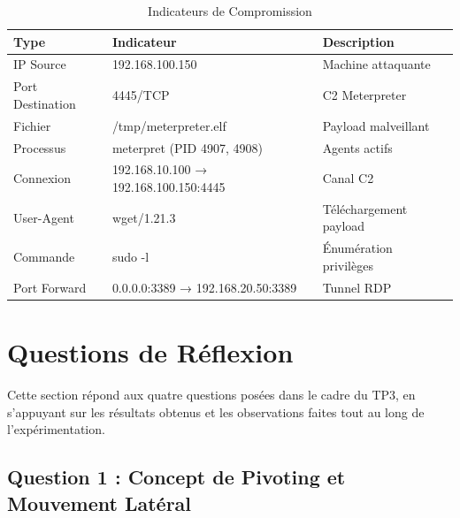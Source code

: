 \documentclass[12pt,a4paper,openany]{report}
\newcommand{\tableheadcolor}{\rowcolor{tableheadbg}}
\begin{document}
	\begin{table}[H]
		\centering
		\small
		\renewcommand{\arraystretch}{1.3}
		\setlength{\arrayrulewidth}{0.5pt}
		\begin{tabular}{p{3.5cm} p{4cm} p{5cm}}
			\arrayrulecolor{tableborder}
			\hline
			\tableheadcolor
			\textcolor{tableheadfg}{\textbf{Type}} &
			\textcolor{tableheadfg}{\textbf{Indicateur}} &
			\textcolor{tableheadfg}{\textbf{Description}} \\
			\hline
			\rowcolor{tablerowalt}
			IP Source & 192.168.100.150 & Machine attaquante \\
			Port Destination & 4445/TCP & C2 Meterpreter \\
			\rowcolor{tablerowalt}
			Fichier & /tmp/meterpreter.elf & Payload malveillant \\
			Processus & meterpret (PID 4907, 4908) & Agents actifs \\
			\rowcolor{tablerowalt}
			Connexion & 192.168.10.100 → 192.168.100.150:4445 & Canal C2 \\
			User-Agent & wget/1.21.3 & Téléchargement payload \\
			\rowcolor{tablerowalt}
			Commande & sudo -l & Énumération privilèges \\
			Port Forward & 0.0.0.0:3389 → 192.168.20.50:3389 & Tunnel RDP \\
			\hline
		\end{tabular}
		\caption{Indicateurs de Compromission}
		\label{tab:iocs}
	\end{table}
	
	
	
	\section{Questions de Réflexion}
	
	Cette section répond aux quatre questions posées dans le cadre du TP3, 
	en s'appuyant sur les résultats obtenus et les observations faites tout 
	au long de l'expérimentation.
	
	
	\subsection{Question 1 : Concept de Pivoting et Mouvement Latéral}
	
\end{document}
